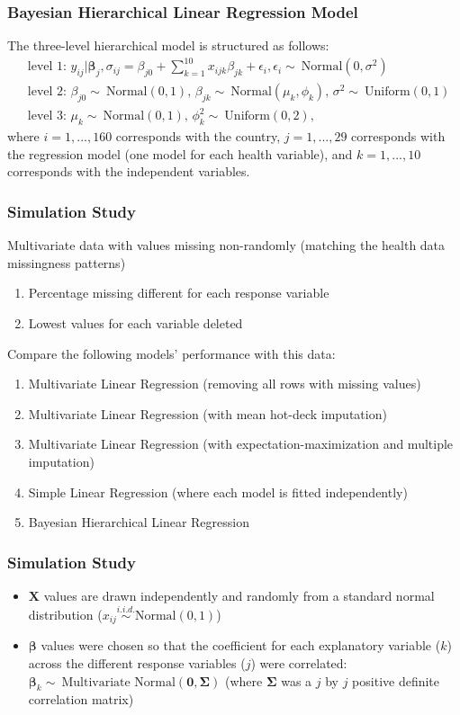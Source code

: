 \documentclass{beamer}
\begin{document}
\begin{frame}
\frametitle{Bayesian Hierarchical Linear Regression Model}
The three-level hierarchical model is structured as follows:
\footnotesize
\begin{equation}
\begin{split}
&\text{level 1: } y_{ij}|\boldsymbol{\beta}_{j},\sigma_{ij} = \beta_{j0} + \sum_{k=1}^{10} x_{ijk} \beta_{jk} + \epsilon_{i}, \epsilon_{i} \sim\ \text{Normal}(0,\sigma^2) \\
&\text{level 2: } \beta_{j0} \sim\ \text{Normal}(0,1) \text{, } \beta_{jk} \sim\ \text{Normal}(\mu_{k},\phi_{k}) \text{, } \sigma^2 \sim\ \text{Uniform}(0,1) \\
&\text{level 3: } \mu_{k} \sim\ \text{Normal}(0,1) \text{, } \phi_{k}^2 \sim\ \text{Uniform}(0, 2), 
\end{split}
\end{equation}
where $i=1,...,160$ corresponds with the country, $j=1,...,29$ corresponds with the regression model (one model for each health variable), and $k=1,...,10$ corresponds with the independent variables.
\end{frame}

\begin{frame}
\frametitle{Simulation Study}
Multivariate data with values missing non-randomly (matching the health data missingness patterns)
\begin{enumerate}
\item Percentage missing different for each response variable
\item Lowest values for each variable deleted
\end{enumerate}
Compare the following models' performance with this data:
\begin{enumerate}
\item Multivariate Linear Regression (removing all rows with missing values)
\item Multivariate Linear Regression (with mean hot-deck imputation)
\item Multivariate Linear Regression (with expectation-maximization and multiple imputation)
\item Simple Linear Regression (where each model is fitted independently)
\item Bayesian Hierarchical Linear Regression 
\end{enumerate}
\end{frame}

\begin{frame}
\frametitle{Simulation Study}
\begin{itemize}
\item $\mathbf{X}$ values are drawn independently and randomly from a standard normal distribution ($x_{ij} \stackrel{i.i.d.}{\sim} \text{Normal}(0,1)$)
\item $\boldsymbol{\beta}$ values were chosen so that the coefficient for each explanatory variable ($k$) across the different response variables ($j$) were correlated: $\boldsymbol{\beta}_k \sim\ \text{Multivariate Normal}(\mathbf{0},\boldsymbol{\Sigma})$ (where $\boldsymbol{\Sigma}$ was a $j$ by $j$ positive definite correlation matrix)
\end{itemize}
\end{frame}
\end{document}
